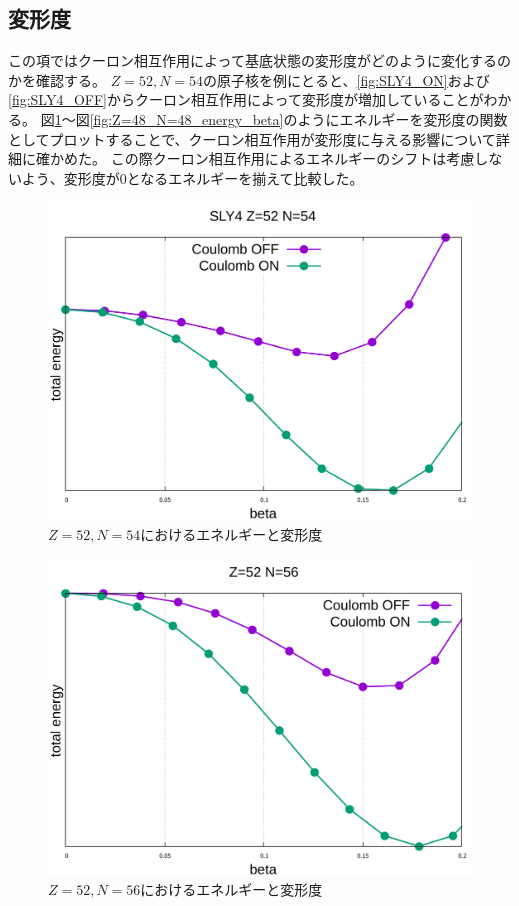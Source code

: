 \documentclass[12pt]{jarticle}
\begin{document}
\subsection{変形度}
この項ではクーロン相互作用によって基底状態の変形度がどのように変化するのかを確認する。
$Z=52,N=54$の原子核を例にとると、\ref{fig:SLY4_ON}および\ref{fig:SLY4_OFF}からクーロン相互作用によって変形度が増加していることがわかる。
図\ref{fig:Z=52_N=54_energy_beta}～図\ref{fig:Z=48_N=48_energy_beta}のようにエネルギーを変形度の関数としてプロットすることで、クーロン相互作用が変形度に与える影響について詳細に確かめた。
この際クーロン相互作用によるエネルギーのシフトは考慮しないよう、変形度が0となるエネルギーを揃えて比較した。
\begin{figure}[h]
    \centering
    \includegraphics[width=120mm]{../Z=52_N=54_energy_beta.pdf}
    \caption{$Z=52,N=54$におけるエネルギーと変形度}\label{fig:Z=52_N=54_energy_beta}
\end{figure}
\begin{figure}[h]
    \centering
    \includegraphics[width=120mm]{../Z=52_N=56_energy_beta.pdf}
    \caption{$Z=52,N=56$におけるエネルギーと変形度}\label{fig:Z=52_N=56_energy_beta}
\end{figure}
\end{document}
